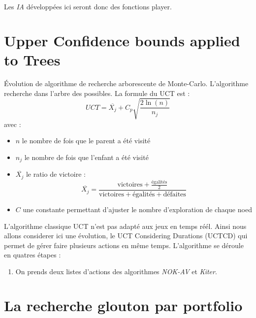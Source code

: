 \documentclass[a4paper, 11pt]{article}
\theoremstyle{definition}
\begin{document}
Les \emph{IA} développées ici seront donc des fonctions player.

\section{Upper Confidence bounds applied to Trees}
Évolution de algorithme de recherche arborescente de Monte-Carlo.
L'algorithme recherche dans l'arbre des possibles. La formule du UCT est :
$$UCT = \overline{X_j} + C_p \sqrt{\frac{2 \ln(n)}{n_j}} $$ 
avec :
\begin{itemize}
    \item $n$ le nombre de fois que le parent a été visité
    \item $n_j$ le nombre de fois que l'enfant a été visité
    \item $\overline{X_j}$ le ratio de victoire : $$\overline{X_j} = \frac{\text{victoires} + \frac{\text{égalités}}{2}}{\text{victoires} + \text{égalités} + \text{défaites}}$$
    \item $C$ une constante permettant d'ajuster le nombre d'exploration de chaque noed
\end{itemize}
L'algorithme classique UCT n'est pas adapté aux jeux en temps réél. Ainsi nous 
allons considerer ici une évolution, le UCT Considering Durations (UCTCD) qui 
permet de gérer faire plusieurs actions en même temps. 
L'algorithme se déroule en quatres étapes :
\begin{enumerate}
    \item On prends deux listes d'actions des algorithmes \emph{NOK-AV} et \emph{Kiter}.
\end{enumerate}

\section{La recherche glouton par portfolio}
\begin{lstlisting}
\end{lstlisting}
\end{document}
